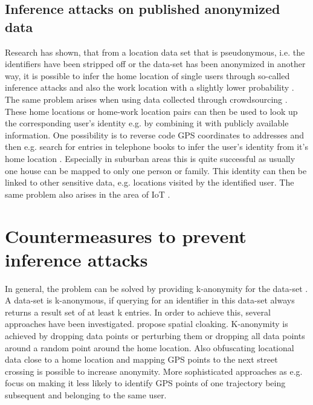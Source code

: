 \subsection{Inference attacks on published anonymized data}
Research has shown, that from a location data set that is pseudonymous, i.e. the identifiers have been stripped off or the data-set has been anonymized in another way, it is possible to infer the home location of single users through so-called inference attacks \parencite{krumm, cellphone, privacy-home-work-pairs, hoh2006enhancing, twitter} and also the work location with a slightly lower probability \parencite{cellphone, privacy-home-work-pairs}. The same problem arises when using data collected through crowdsourcing \parencite{crowdsourcing}.
These home locations or home-work location pairs can then be used to look up the corresponding user's identity e.g. by combining it with publicly available information. One possibility is to reverse code GPS coordinates to addresses and then e.g. search for entries in telephone books to infer the user's identity from it's home location \parencite{krumm, privacy-home-work-pairs, hoh2006enhancing}. Especially in suburban areas this is quite successful as usually one house can be mapped to only one person or family. This identity can then be linked to other sensitive data, e.g. locations visited by the identified user. The same problem also arises in the area of IoT \parencite{iot, hoh2006enhancing}.

\section{Countermeasures to prevent inference attacks}
In general, the problem can be solved by providing k-anonymity for the data-set \parencite{k-anonymity}. A data-set is k-anonymous, if querying for an identifier in this data-set always returns a result set of at least k entries.
In order to achieve this, several approaches have been investigated. 
\parencite{krumm} propose spatial cloaking. K-anonymity is achieved by dropping data points or perturbing them or dropping all data points around a random point around the home location. Also obfuscating locational data close to a home location and mapping GPS points to the next street crossing is possible to increase anonymity.
More sophisticated approaches as e.g. \parencite{time-to-confusion} focus on making it less likely to identify GPS points of one trajectory being subsequent and belonging to the same user.

